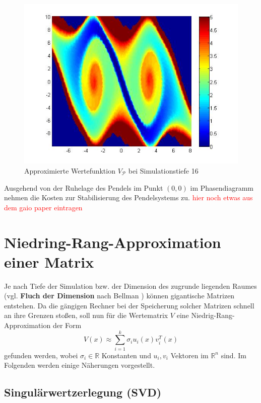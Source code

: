 \documentclass[12pt,a4paper,twoside]{article}
\begin{document}
	\begin{figure}[h]
		
		\center
		\includegraphics[scale=0.55]{valuefunction_plot_256.jpg}
		\caption{\label{pic:Vapp}Approximierte Wertefunktion $V_\mathcal{P}$ bei Simulationstiefe 16}
	\end{figure}
	\newline
	Ausgehend von der Ruhelage des Pendels im Punkt $(0,0)$ im Phasendiagramm nehmen die Kosten zur Stabilisierung 
	des Pendelsystems zu.
	\textcolor{red}{hier noch etwas aus dem gaio paper eintragen}
	\newpage
\section{Niedring-Rang-Approximation einer Matrix}
	Je nach Tiefe der Simulation bzw. der Dimension des zugrunde liegenden Raumes (vgl. \textbf{Fluch der Dimension} 
	nach Bellman \citep{Bellman1961}) können gigantische Matrizen entstehen. Da die gängigen Rechner bei der 
	Speicherung solcher Matrizen schnell an ihre Grenzen stoßen, soll nun für die Wertematrix $V$ eine Niedrig-Rang-
	Approximation der Form
	\begin{equation}
		\label{eq:approx}
		V(x)\approx \sum_{i=1}^k\sigma_i u_i(x) v_i^T(x)
	\end{equation}
	gefunden werden, wobei $\sigma_i\in \mathds{R}$ Konstanten und $u_i, v_i$ Vektoren im $\mathds{R}^n$ sind. Im Folgenden werden einige Näherungen vorgestellt.
	\subsection{Singulärwertzerlegung (SVD)}
		\label{sec:SVD}
\end{document}
